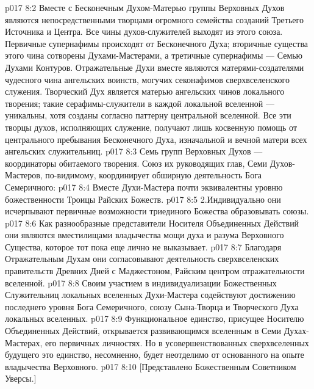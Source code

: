 \vs p017 8:2 \pc Вместе с Бесконечным Духом\hyp{}Матерью группы Верховных Духов являются непосредственными творцами огромного семейства созданий Третьего Источника и Центра. Все чины духов\hyp{}служителей выходят из этого союза. Первичные супернафимы происходят от Бесконечного Духа; вторичные существа этого чина сотворены Духами\hyp{}Мастерами, а третичные супернафимы --- Семью Духами Контуров. Отражательные Духи вместе являются матерями\hyp{}создателями чудесного чина ангельских воинств, могучих секонафимов сверхвселенского служения. Творческий Дух является матерью ангельских чинов локального творения; такие серафимы\hyp{}служители в каждой локальной вселенной --- уникальны, хотя созданы согласно паттерну центральной вселенной. Все эти творцы духов, исполняющих служение, получают лишь косвенную помощь от центрального пребывания Бесконечного Духа, изначальной и вечной матери всех ангельских служительниц.
\vs p017 8:3 \pc Семь групп Верховных Духов --- координаторы обитаемого творения. Союз их руководящих глав, Семи Духов\hyp{}Мастеров, по\hyp{}видимому, координирует обширную деятельность Бога Семеричного:
\vs p017 8:4 \bibnobreakspace Вместе Духи\hyp{}Мастера почти эквивалентны уровню божественности Троицы Райских Божеств.
\vs p017 8:5 2.Индивидуально они исчерпывают первичные возможности триединого Божества образовывать союзы.
\vs p017 8:6 \bibnobreakspace Как разнообразные представители Носителя Объединенных Действий они являются вместилищами владычества мощи духа и разума Верховного Существа, которое тот пока еще лично не выказывает.
\vs p017 8:7 \bibnobreakspace Благодаря Отражательным Духам они согласовывают деятельность сверхвселенских правительств Древних Дней с Маджестоном, Райским центром отражательности вселенной.
\vs p017 8:8 \bibnobreakspace Своим участием в индивидуализации Божественных Служительниц локальных вселенных Духи\hyp{}Мастера содействуют достижению последнего уровня Бога Семеричного, союзу Сына\hyp{}Творца и Творческого Духа локальных вселенных.
\vs p017 8:9 \pc Функциональное единство, присущее Носителю Объединенных Действий, открывается развивающимся вселенным в Семи Духах\hyp{}Мастерах, его первичных личностях. Но в усовершенствованных сверхвселенных будущего это единство, несомненно, будет неотделимо от основанного на опыте владычества Верховного.
\vsetoff
\vs p017 8:10 [Представлено Божественным Советником Уверсы.]
